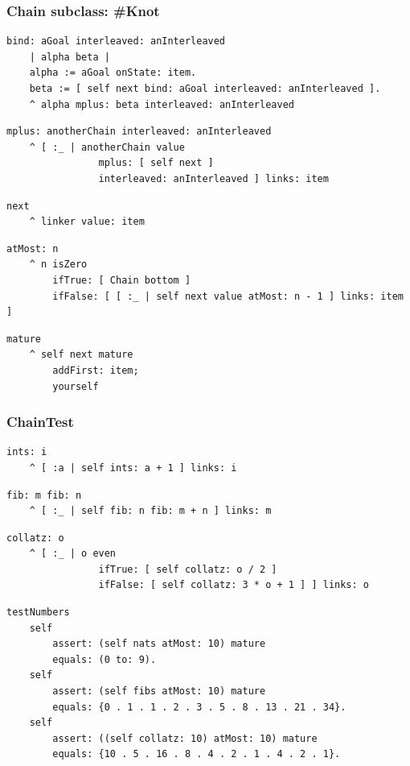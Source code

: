 \documentclass[9pt]{beamer}
\begin{document}
\begin{frame}[fragile]
\frametitle{Chain subclass: \#Knot}
\begin{verbatim}
bind: aGoal interleaved: anInterleaved
    | alpha beta |
    alpha := aGoal onState: item.
    beta := [ self next bind: aGoal interleaved: anInterleaved ].
    ^ alpha mplus: beta interleaved: anInterleaved
\end{verbatim}
\begin{verbatim}
mplus: anotherChain interleaved: anInterleaved
    ^ [ :_ | anotherChain value
                mplus: [ self next ]
                interleaved: anInterleaved ] links: item
\end{verbatim}
\begin{verbatim}
next
    ^ linker value: item
\end{verbatim}
\begin{verbatim}
atMost: n
    ^ n isZero
        ifTrue: [ Chain bottom ]
        ifFalse: [ [ :_ | self next value atMost: n - 1 ] links: item ]
\end{verbatim}
\begin{verbatim}
mature
    ^ self next mature
        addFirst: item;
        yourself
\end{verbatim}
\end{frame}

\begin{frame}[fragile]
\frametitle{ChainTest}
\begin{verbatim}
ints: i
    ^ [ :a | self ints: a + 1 ] links: i
\end{verbatim}
\begin{verbatim}
fib: m fib: n
    ^ [ :_ | self fib: n fib: m + n ] links: m
\end{verbatim}
\begin{verbatim}
collatz: o
    ^ [ :_ | o even
                ifTrue: [ self collatz: o / 2 ]
                ifFalse: [ self collatz: 3 * o + 1 ] ] links: o
\end{verbatim}
\begin{verbatim}
testNumbers
    self
        assert: (self nats atMost: 10) mature
        equals: (0 to: 9).
    self
        assert: (self fibs atMost: 10) mature
        equals: {0 . 1 . 1 . 2 . 3 . 5 . 8 . 13 . 21 . 34}.
    self
        assert: ((self collatz: 10) atMost: 10) mature
        equals: {10 . 5 . 16 . 8 . 4 . 2 . 1 . 4 . 2 . 1}.
\end{verbatim}
\end{frame}
\end{document}
